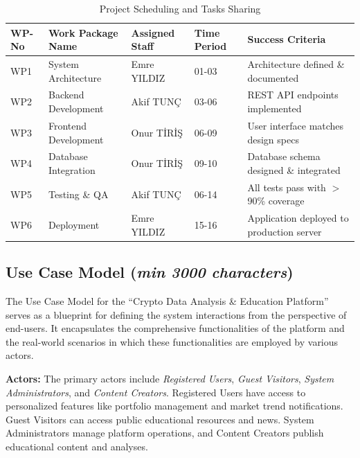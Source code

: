 \documentclass[12pt]{report}
\newcommand{\characters}[1]{(\textit{min #1 characters})}
\begin{document}
\begin{table}[h]
\centering
\begin{tabular}{|l|l|l|p{2cm}|p{4cm}|}
\hline
\textbf{WP-No} & \textbf{Work Package Name} & \textbf{Assigned Staff} & \textbf{Time Period} & \textbf{Success Criteria} \\ \hline
WP1            & System Architecture        & Emre YILDIZ             & 01-03                & Architecture defined \& documented \\ \hline
WP2            & Backend Development        & Akif TUNÇ             & 03-06                & REST API endpoints implemented \\ \hline
WP3            & Frontend Development       & Onur TİRİŞ             & 06-09                & User interface matches design specs \\ \hline
WP4            & Database Integration       & Onur TİRİŞ             & 09-10                & Database schema designed \& integrated \\ \hline
WP5            & Testing \& QA              & Akif TUNÇ             & 06-14                & All tests pass with $>$ 90\% coverage \\ \hline
WP6            & Deployment                 & Emre YILDIZ             & 15-16                & Application deployed to production server \\ \hline
\end{tabular}
\caption{Project Scheduling and Tasks Sharing}
\label{table:project_schedule}
\end{table}



\subsection{Use Case Model \characters{3000}}
The Use Case Model for the ``Crypto Data Analysis \& Education Platform'' serves as a blueprint for defining the system interactions from the perspective of end-users. It encapsulates the comprehensive functionalities of the platform and the real-world scenarios in which these functionalities are employed by various actors.

\textbf{Actors:} The primary actors include \textit{Registered Users}, \textit{Guest Visitors}, \textit{System Administrators}, and \textit{Content Creators}. Registered Users have access to personalized features like portfolio management and market trend notifications. Guest Visitors can access public educational resources and news. System Administrators manage platform operations, and Content Creators publish educational content and analyses.
\end{document}
